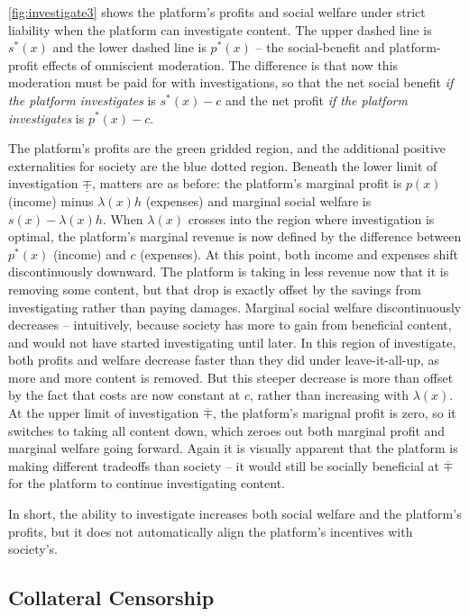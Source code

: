 \autoref{fig:investigate3} shows the platform's profits and social welfare under strict liability when the platform can investigate content. The upper dashed line is $s^*(x)$ and the lower dashed line is $p^*(x)$ -- the social-benefit and platform-profit effects of omniscient moderation. The difference is that now this moderation must be paid for with investigations, so that the net social benefit \emph{if the platform investigates} is $s^*(x) - c$ and the net profit \emph{if the platform investigates} is $p^*(x) - c$. 

The platform's profits are the green gridded region, and the additional positive externalities for society are the blue dotted region. Beneath the lower limit of investigation $\underline{\mp}$, matters are as before: the platform's marginal profit is $p(x)$ (income) minus $\lambda(x)h$ (expenses) and marginal social welfare is $s(x) - \lambda(x)h$. When $\lambda(x)$ crosses into the region where investigation is optimal, the platform's marginal revenue is now defined by the difference between $p^*(x)$ (income) and $c$ (expenses). At this point, both income and expenses shift discontinuously downward. The platform is taking in less revenue now that it is removing some content, but that drop is exactly offset by the savings from investigating rather than paying damages. Marginal social welfare discontinuously decreases -- intuitively, because society has more to gain from beneficial content, and would not have started investigating until later. In this region of investigate, both profits and welfare decrease faster than they did under leave-it-all-up, as more and more content is removed. But this steeper decrease is more than offset by the fact that costs are now constant at $c$, rather than increasing with $\lambda(x)$. At the upper limit of investigation $\overline{\mp}$, the platform's marignal profit is zero, so it switches to taking all content down, which zeroes out both marginal profit and marginal welfare going forward. Again it is visually apparent that the platform is making different tradeoffs than society -- it would still be socially beneficial at $\overline{\mp}$ for the platform to continue investigating content.

In short, the ability to investigate increases both social welfare and the platform's profits, but it does not automatically align the platform's incentives with society's.

\subsection{Collateral Censorship}

